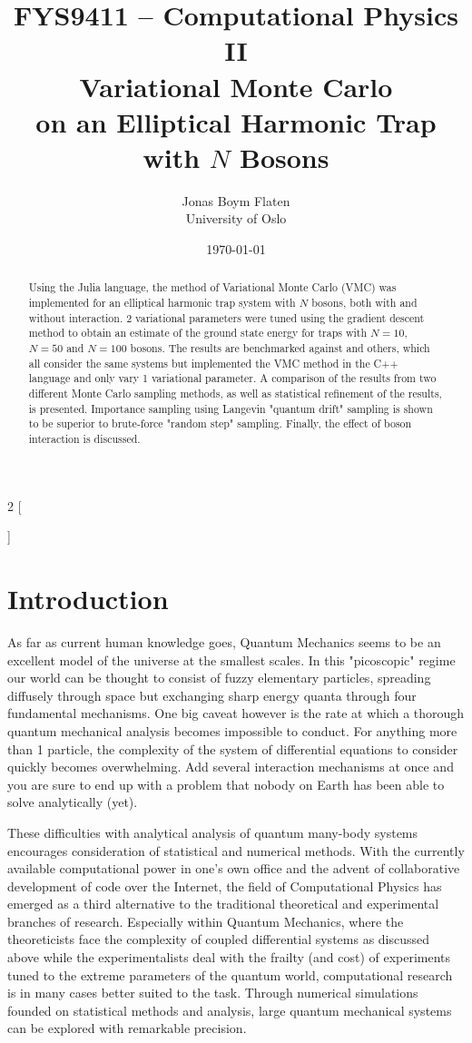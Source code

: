 \documentclass[a4paper,8pt]{article}
\title{\small FYS9411 – Computational Physics II \\
\Huge Variational Monte Carlo\\\huge on an Elliptical Harmonic Trap with $N$ Bosons}
\author{\large Jonas Boym Flaten \\
\small University of Oslo}
\date{\today}
\begin{document}
\begin{multicols}{2}
[
\maketitle
\begin{abstract}
Using the Julia language, the method of Variational Monte Carlo (VMC) was implemented for an elliptical harmonic trap system with $N$ bosons, both with and without interaction. 2 variational parameters were tuned using the gradient descent method to obtain an estimate of the ground state energy for traps with $N = 10$, $N = 50$ and $N = 100$ bosons. The results are benchmarked against \cite{SWL} and others, which all consider the same systems but implemented the VMC method in the C++ language and only vary 1 variational parameter. A comparison of the results from two different Monte Carlo sampling methods, as well as statistical refinement of the results, is presented. Importance sampling using Langevin "quantum drift" sampling is shown to be superior to brute-force "random step" sampling. Finally, the effect of boson interaction is discussed. 
\end{abstract}
]

\section{Introduction}
As far as current human knowledge goes, Quantum Mechanics seems to be an excellent model of the universe at the smallest scales. In this "picoscopic" regime our world can be thought to consist of fuzzy elementary particles, spreading diffusely through space but exchanging sharp energy quanta through four fundamental mechanisms. One big caveat however is the rate at which a thorough quantum mechanical analysis becomes impossible to conduct. For anything more than 1 particle, the complexity of the system of differential equations to consider quickly becomes overwhelming. Add several interaction mechanisms at once and you are sure to end up with a problem that nobody on Earth has been able to solve analytically (yet).

These difficulties with analytical analysis of quantum many-body systems encourages consideration of statistical and numerical methods. With the 
currently available computational power in one's own office and the advent of collaborative development of code over the Internet, the field of Computational Physics has emerged as a third alternative to the traditional theoretical and experimental branches of research. Especially within Quantum Mechanics, where the theoreticists face the complexity of coupled differential systems as discussed above while the experimentalists deal with the frailty (and cost) of experiments tuned to the extreme parameters of the quantum world, computational research is in many cases better suited to the task. Through numerical simulations founded on statistical methods and analysis, large quantum mechanical systems can be explored with remarkable precision.


\end{multicols}
\end{document}
